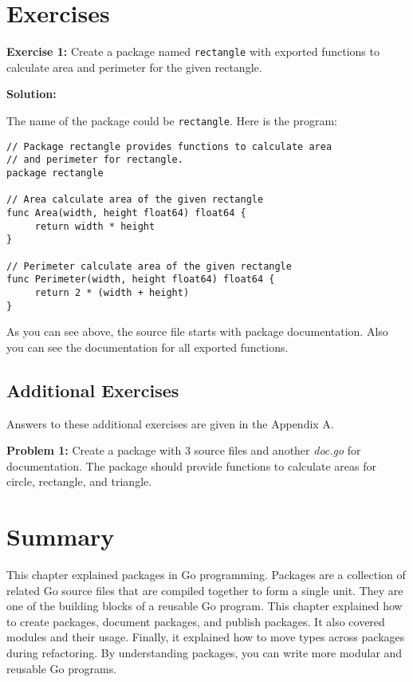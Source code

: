 \section{Exercises}

{\bf Exercise 1:} Create a package named \texttt{rectangle} with
exported functions to calculate area and perimeter for the given
rectangle.

\textbf{Solution:}

The name of the package could be \texttt{rectangle}.  Here is the
program:

\begin{lstlisting}[numbers=none]
// Package rectangle provides functions to calculate area
// and perimeter for rectangle.
package rectangle

// Area calculate area of the given rectangle
func Area(width, height float64) float64 {
     return width * height
}

// Perimeter calculate area of the given rectangle
func Perimeter(width, height float64) float64 {
     return 2 * (width + height)
}
\end{lstlisting}

As you can see above, the source file starts with package
documentation.  Also you can see the documentation for all exported
functions.

\subsection{Additional Exercises}

Answers to these additional exercises are given in the Appendix A.

{\bf Problem 1:} Create a package with 3 source files and
another \textit{doc.go} for documentation.  The package should provide
functions to calculate areas for circle, rectangle, and triangle.

\section*{Summary}

This chapter explained packages in Go programming. Packages are a collection of
related Go source files that are compiled together to form a single unit. They
are one of the building blocks of a reusable Go program. This chapter explained
how to create packages, document packages, and publish packages. It also covered
modules and their usage. Finally, it explained how to move types across packages
during refactoring. By understanding packages, you can write more modular and
reusable Go programs.
